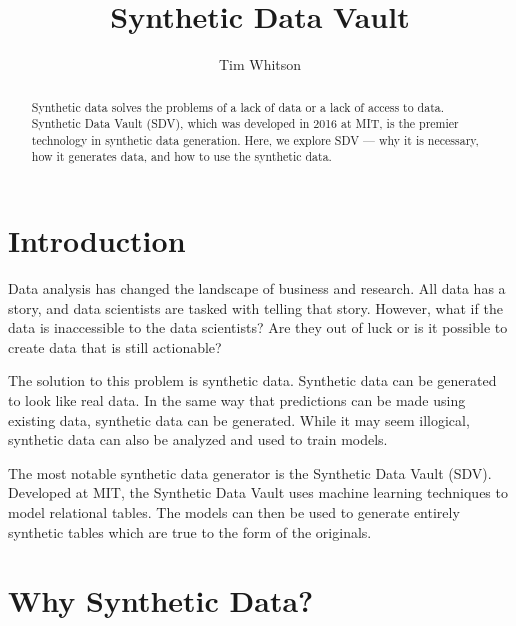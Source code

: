 
\title{Synthetic Data Vault}

\author{Tim Whitson}

\renewcommand{\shortauthors}{T. Whitson}

\begin{abstract}
Synthetic data solves the problems of a lack of data or a lack of access to
data. Synthetic Data Vault (SDV), which was developed in 2016 at MIT, is the
premier technology in synthetic data generation. Here, we explore SDV ---
why it is necessary, how it generates data, and how to use the synthetic
data. %
\end{abstract}


\maketitle

\section{Introduction}

Data analysis has changed the landscape of business and research. All data
has a story, and data scientists are tasked with telling that story. However,
what if the data is inaccessible to the data scientists? Are they out of
luck or is it possible to create data that is still actionable?

The solution to this problem is synthetic data. Synthetic data can be generated
to look like real data. In the same way that predictions can be made using
existing data, synthetic data can be generated. While it may seem illogical,
synthetic data can also be analyzed and used to train models.

The most notable synthetic data generator is the Synthetic Data Vault
(SDV). Developed at MIT, the Synthetic Data Vault uses machine learning
techniques to model relational tables. The models can then be used to generate
entirely synthetic tables which are true to the form of the originals.\cite{}

\section{Why Synthetic Data?}

